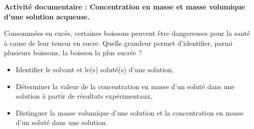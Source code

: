 \renewcommand{\thesubsection}{\textcolor{red}{\Roman{section}.\arabic{subsection}}}
\renewcommand{\thesubsubsection}{\textcolor{red}{\Roman{section}.\arabic{subsection}.\alph{subsubsection}}}

\setcounter{section}{0}
\setcounter{document}{0}
\sndEnTeteActDeux

\begin{center}
\begin{mdframed}[style=titr, leftmargin=60pt, rightmargin=60pt, innertopmargin=7pt, innerbottommargin=7pt, innerrightmargin=8pt, innerleftmargin=8pt]

\begin{center}
\large{\textbf{Activité documentaire : Concentration en masse et masse volumique d'une solution acqueuse.}}
\end{center}

\end{mdframed}
\end{center}

\begin{tcolorbox}[colback=orange!5!white,colframe=orange!75!black,title= Contexte de l'activité]
Consommées en excès, certaines boissons peuvent être dangereuses pour la santé à cause de leur teneur en sucre. Quelle grandeur permet d’identifier, parmi plusieurs boissons, la boisson la plus sucrée ?
\end{tcolorbox}
\begin{tcolorbox}[colback=blue!5!white,colframe=blue!75!black,title=Objectifs :]
\begin{itemize}
    \item Identifier le solvant et le(s) soluté(s) d’une solution,
    \item Déterminer la valeur de la concentration en masse d’un soluté dans une solution à partir de résultats expérimentaux,
    \item Distinguer la masse volumique d’une solution et la concentration en masse d’un soluté dans une solution.
\end{itemize}
\end{tcolorbox}

   
